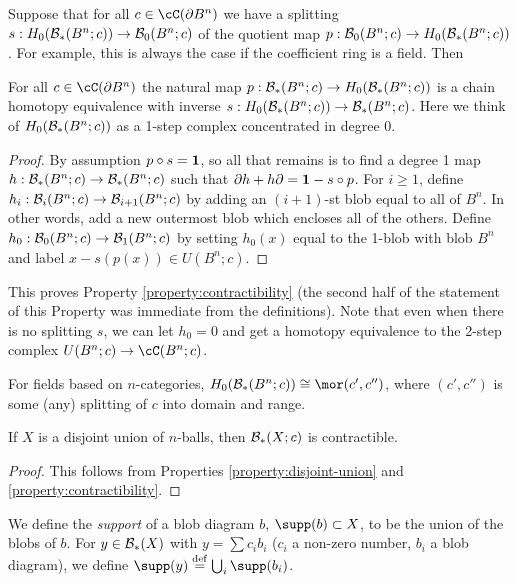 Suppose that for all $c \in \cC(\bd B^n)$
we have a splitting $s: H_0({\mathcal B}_*(B^n; c)) \to {\mathcal B}_0(B^n; c)$
of the quotient map
$p: {\mathcal B}_0(B^n; c) \to H_0({\mathcal B}_*(B^n; c))$.
For example, this is always the case if the coefficient ring is a field.
Then
\begin{prop} \label{bcontract}
For all $c \in \cC(\bd B^n)$ the natural map $p: {\mathcal B}_*(B^n; c) \to H_0({\mathcal B}_*(B^n; c))$
is a chain homotopy equivalence
with inverse $s: H_0({\mathcal B}_*(B^n; c)) \to {\mathcal B}_*(B^n; c)$.
Here we think of $H_0({\mathcal B}_*(B^n; c))$ as a 1-step complex concentrated in degree 0.
\end{prop}
\begin{proof}
By assumption $p\circ s = \boldsymbol{1}$, so all that remains is to find a degree 1 map
$h : {\mathcal B}_*(B^n; c) \to {\mathcal B}_*(B^n; c)$ such that $\partial h + h\partial = \boldsymbol{1} - s \circ p$.
For $i \ge 1$, define $h_i : {\mathcal B}_i(B^n; c) \to {\mathcal B}_{i+1}(B^n; c)$ by adding
an $(i{+}1)$-st blob equal to all of $B^n$.
In other words, add a new outermost blob which encloses all of the others.
Define $h_0 : {\mathcal B}_0(B^n; c) \to {\mathcal B}_1(B^n; c)$ by setting $h_0(x)$ equal to
the 1-blob with blob $B^n$ and label $x - s(p(x)) \in U(B^n; c)$.
\end{proof}
This proves Property \ref{property:contractibility} (the second half of the 
statement of this Property was immediate from the definitions).
Note that even when there is no splitting $s$, we can let $h_0 = 0$ and get a homotopy
equivalence to the 2-step complex $U(B^n; c) \to \cC(B^n; c)$.

For fields based on $n$-categories, $H_0(\bc_*(B^n; c)) \cong \mor(c', c'')$,
where $(c', c'')$ is some (any) splitting of $c$ into domain and range.

\begin{cor} \label{disj-union-contract}
If $X$ is a disjoint union of $n$-balls, then ${\mathcal B}_*(X; c)$ is contractible.
\end{cor}

\begin{proof}
This follows from Properties \ref{property:disjoint-union} and \ref{property:contractibility}.
\end{proof}

We define the {\it support} of a blob diagram $b$, $\supp(b) \sub X$, 
to be the union of the blobs of $b$.
For $y \in {\mathcal B}_*(X)$ with $y = \sum c_i b_i$ ($c_i$ a non-zero number, $b_i$ a blob diagram),
we define $\supp(y) \deq \bigcup_i \supp(b_i)$.

